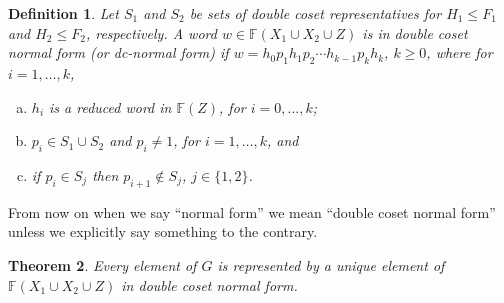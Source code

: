 \documentclass[a4paper,12pt]{article}
\newtheorem{theorem}{Theorem}[section]
\newtheorem{definition}[theorem]{Definition}
\numberwithin{equation}{section}
\numberwithin{figure}{section}
\newcommand{\FF}{\ensuremath{\mathbb{F}}}
\newcommand{\be}{\begin{enumerate}}
\newcommand{\ee}{\end{enumerate}}
\begin{document}
\begin{definition}\label{def:dcnf}
 Let $S_1$ and $S_2$ be sets of  double coset representatives for
$H_1\le F_1$ and $H_2\le F_2$, respectively.
A word $w\in \FF(X_1\cup X_2\cup Z)$ is in
\emph{double coset normal form} (or \emph{dc-normal form}) if
$w = h_{0}p_1h_{1}p_2 \cdots h_{k-1}p_kh_{{k}}$, $k\ge 0$,   where for $i=1,\ldots, k$,
\be[(a)]
\item $h_i$ is a reduced word in $\FF(Z)$, for $i=0,\ldots, k$;
\item  $p_i  \in S_1\cup S_2$ and $p_i\neq 1$, for $i=1,\ldots, k$,  and
\item if  $p_i\in S_j$ then $p_{i+1}\notin S_j$, $j\in \{1,2\}$.
\ee
\end{definition}
From now on when we say ``normal form'' we mean ``double coset normal form'' unless
we explicitly say something to the contrary.
\begin{theorem}\label{thm:dcnf}
Every element of $G$ is represented by a unique element of
$\FF(X_1\cup X_2\cup Z)$ in double coset normal form.
\end{theorem}
\end{document}
